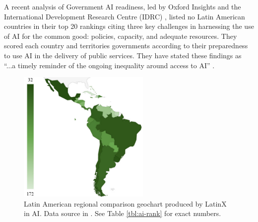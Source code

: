 \documentclass[conference]{IEEEtran}
\begin{document}
A recent analysis of Government AI readiness, led by Oxford Insights and the International Development Research Centre (IDRC) \cite{miller2019government}, listed no Latin American countries in their top 20 rankings citing three key challenges in harnessing the use of AI for the common good: policies, capacity, and adequate resources. They scored each country and territories governments according to their preparedness to use AI in the delivery of public services. They have stated these findings as ``...a timely reminder of the ongoing inequality around access to AI'' \cite{miller2019government}.

\begin{figure}[!t]
\centering
\includegraphics[width=2.5in]{air-rank-no-table}
\caption{Latin American regional comparison geochart produced by LatinX in AI\texttrademark. Data source in \cite{miller2019government}. See Table \ref{tbl:ai-rank} for exact numbers.}
\label{fig:ai-rank}
\end{figure}
\end{document}
